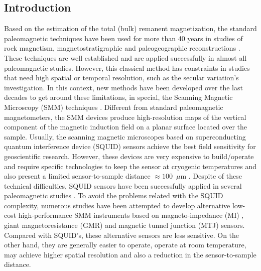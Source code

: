 \documentclass[galley,gc]{agutex}
\begin{document}
\begin{article}




\section{Introduction}
\label{sec:Introduction}

Based on the estimation of the total (bulk) remanent magnetization, the standard 
paleomagnetic techniques have been used for more than 40 years in studies of rock magnetism, 
magnetostratigraphic and paleogeographic reconstructions \citep{voo1993}. These techniques 
are well established and are applied successfully in almost all paleomagnetic studies. 
However, this classical method has constraints in studies that need high spatial or 
temporal resolution, such as the secular variation's investigation. In this context, new 
methods have been developed over the last decades to get around these limitations, in special, 
the Scanning Magnetic Microscopy (SMM) techniques \citep{oda2011, fu2014}. Different from 
standard paleomagnetic magnetometers, the SMM devices produce high-resolution maps of the 
vertical component of the magnetic induction field on a planar surface located over the 
sample. Usually, the scanning magnetic microscopes based on superconducting quantum 
interference device (SQUID) sensors achieve the best field sensitivity for geoscientific 
research. However, these devices are very expensive to build/operate and require specific 
technologies to keep the sensor at cryogenic temperatures and also present a limited 
sensor-to-sample distance $\approx 100$~$\mu$m \citep{baudenbacher2003, fong2005}. 
Despite of these technical difficulties, SQUID sensors have been successfully applied 
in several paleomagnetic studies \citep{gattacceca2006,weiss2007b, oda2011, fu2014}. 
To avoid the problems related with the SQUID complexity, numerous studies have been 
attempted to develop alternative low-cost high-performance SMM instruments based on 
magneto-impedance (MI) \citep{uehara2007, uehara2008}, giant magnetoresistance (GMR) 
\citep{hankard2009} and magnetic tunnel junction (MTJ) \citep{lima2014} sensors. 
Compared with SQUID's, these alternative sensors are less sensitive. On the other 
hand, they are generally easier to operate, operate at room temperature, 
may achieve higher spatial resolution and also a reduction in the sensor-to-sample 
distance.


\end{article}
\end{document}
